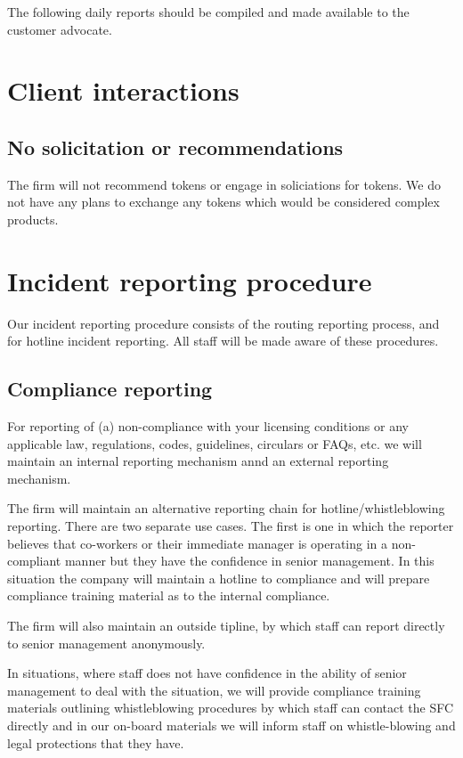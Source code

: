 The following daily reports should be compiled and made available to
the customer advocate.

\section{Client interactions}
\subsection{No solicitation or recommendations}
The firm will not recommend tokens or engage in soliciations for
tokens.  We do not have any plans to exchange any tokens which would
be considered complex products.

\section{Incident reporting procedure}

Our incident reporting procedure consists of the routing reporting
process, and for hotline incident reporting.  All staff will be
made aware of these procedures.

\subsection{Compliance reporting}

For reporting of (a) non-compliance with your licensing conditions or
any applicable law, regulations, codes, guidelines, circulars or
FAQs, etc. we will maintain an internal reporting mechanism annd an
external reporting mechanism.

The firm will maintain an alternative reporting chain for
hotline/whistleblowing reporting.  There are two separate use cases.
The first is one in which the reporter believes that co-workers or
their immediate manager is operating in a non-compliant manner but
they have the confidence in senior management.  In this situation the
company will maintain a hotline to compliance and will prepare
compliance training material as to the internal compliance.

The firm will also maintain an outside tipline, by which staff can
report directly to senior management anonymously.

In situations, where staff does not have confidence in the ability of
senior management to deal with the situation, we will provide
compliance training materials outlining whistleblowing procedures by
which staff can contact the SFC directly and in our on-board materials
we will inform staff on whistle-blowing and legal protections that
they have.

